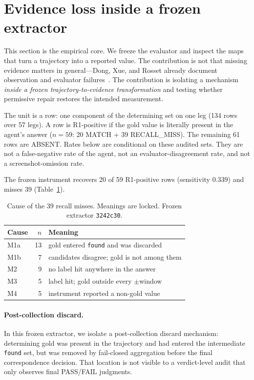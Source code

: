 \documentclass[sigconf,anonymous]{aamas}
\begin{document}
\section{Evidence loss inside a frozen extractor}
\label{sec:s3}

This section is the empirical core.
We freeze the evaluator and inspect the maps that turn a trajectory into a reported value.
The contribution is not that missing evidence matters in general---Dong, Xue, and Rosset already document observation and evaluator failures~\citep{dong2026misscore,xue2025illusion,rosset2026verifiers}.
The contribution is isolating a mechanism \emph{inside a frozen trajectory-to-evidence transformation} and testing whether permissive repair restores the intended measurement.

The unit is a row: one component of the determining set on one leg (134 rows over 57 legs).
A row is R1-positive if the gold value is literally present in the agent's answer ($n=59$: 20 MATCH + 39 RECALL\_MISS).
The remaining 61 rows are ABSENT.
Rates below are conditional on these audited sets.
They are not a false-negative rate of the agent, not an evaluator-disagreement rate, and not a screenshot-omission rate.

The frozen instrument recovers 20 of 59 R1-positive rows (sensitivity $0.339$) and misses 39 (Table~\ref{tab:causes}).

\begin{table}[H]
\centering
\caption{Cause of the 39 recall misses. Meanings are locked. Frozen extractor \texttt{3242c30}.}
\label{tab:causes}
\small
\begin{tabular}{lrl}
\toprule
Cause & $n$ & Meaning \\
\midrule
M1a & 13 & gold entered \texttt{found} and was discarded \\
M1b &  7 & candidates disagree; gold is not among them \\
M2  &  9 & no label hit anywhere in the answer \\
M3  &  5 & label hit; gold outside every $\pm$window \\
M4  &  5 & instrument reported a non-gold value \\
\bottomrule
\end{tabular}
\end{table}

\paragraph{Post-collection discard.}
In this frozen extractor, we isolate a post-collection discard mechanism: determining gold was present in the trajectory and had entered the intermediate \texttt{found} set, but was removed by fail-closed aggregation before the final correspondence decision.
That location is not visible to a verdict-level audit that only observes final PASS/FAIL judgments.
\end{document}
